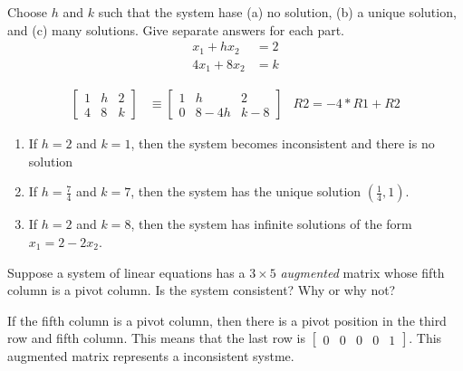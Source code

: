 \documentclass{../mathhomework}
\begin{document}
\pagebreak
\begin{problem}[1.2\#19]
    Choose $h$ and $k$ such that the system hase (a) no solution, (b) a unique solution, and (c) many solutions. Give separate answers for each part.
    \begin{align*}
        x_1 + hx_2 &= 2 \\
        4x_1 + 8x_2 &= k
    \end{align*}

    \begin{solution}
        \begin{align*}
            \begin{bmatrix}
                1 & h & 2 \\
                4 & 8 & k
            \end{bmatrix}
            & \equiv
            \begin{bmatrix}
                1 & h & 2 \\
                0 & 8 - 4h & k - 8
            \end{bmatrix}
            & R2 = -4 * R1 + R2
        \end{align*}

        \begin{enumerate}[label=(\alph*)]
            \item If $h = 2$ and $k = 1$, then the system becomes inconsistent and there is no solution
            \item If $h = \frac{7}{4}$ and $k = 7$, then the system has the unique solution $(\frac{1}{4}, 1)$.
            \item If $h = 2$ and $k = 8$, then the system has infinite solutions of the form $x_1 = 2 - 2x_2$.
        \end{enumerate}
    \end{solution}
\end{problem}

\begin{problem}[1.2\#24]
    Suppose a system of linear equations has a $3 \times 5$ \textit{augmented} matrix whose fifth column is a pivot column. Is the system consistent? Why or why not?

    \begin{solution}
        If the fifth column is a pivot column, then there is a pivot position in the third row and fifth column. 
        This means that the last row is $\begin{bmatrix}
            0 & 0 & 0 & 0 & 1
        \end{bmatrix}$. This augmented matrix represents a inconsistent systme.
    \end{solution}    
\end{problem}
\end{document}
